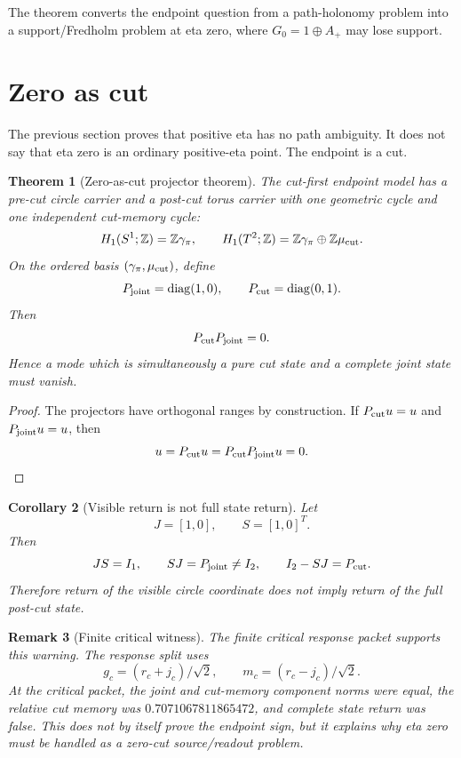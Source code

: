 \documentclass[11pt]{article}
\newtheorem{theorem}{Theorem}[section]
\newtheorem{corollary}[theorem]{Corollary}
\newtheorem{remark}[theorem]{Remark}
\begin{document}
The theorem converts the endpoint question from a path-holonomy problem into a support/Fredholm problem at eta zero, where \(G_0=1\oplus A_+\) may lose support.

\section{Zero as cut}

The previous section proves that positive eta has no path ambiguity.  It does not say that eta zero is an ordinary positive-eta point.  The endpoint is a cut.

\begin{theorem}[Zero-as-cut projector theorem]
The cut-first endpoint model has a pre-cut circle carrier and a post-cut torus carrier with one geometric cycle and one independent cut-memory cycle:
\[
H_1(S^1;\mathbb Z)=\mathbb Z\gamma_\pi,
\qquad
H_1(T^2;\mathbb Z)=\mathbb Z\gamma_\pi\oplus\mathbb Z\mu_{\rm cut}.
\]
On the ordered basis \((\gamma_\pi,\mu_{\rm cut})\), define
\[
P_{\rm joint}=\operatorname{diag}(1,0),
\qquad
P_{\rm cut}=\operatorname{diag}(0,1).
\]
Then
\[
P_{\rm cut}P_{\rm joint}=0.
\]
Hence a mode which is simultaneously a pure cut state and a complete joint state must vanish.
\end{theorem}

\begin{proof}
The projectors have orthogonal ranges by construction.  If \(P_{\rm cut}u=u\) and \(P_{\rm joint}u=u\), then
\[
u=P_{\rm cut}u=P_{\rm cut}P_{\rm joint}u=0.
\]
\end{proof}

\begin{corollary}[Visible return is not full state return]
Let
\[
J=[1,0],\qquad S=[1,0]^T.
\]
Then
\[
JS=I_1,\qquad SJ=P_{\rm joint}\ne I_2,\qquad I_2-SJ=P_{\rm cut}.
\]
Therefore return of the visible circle coordinate does not imply return of the full post-cut state.
\end{corollary}

\begin{remark}[Finite critical witness]
The finite critical response packet supports this warning.  The response split uses
\[
g_c=(r_c+j_c)/\sqrt2,
\qquad
m_c=(r_c-j_c)/\sqrt2.
\]
At the critical packet, the joint and cut-memory component norms were equal, the relative cut memory was \(0.7071067811865472\), and complete state return was false.  This does not by itself prove the endpoint sign, but it explains why eta zero must be handled as a zero-cut source/readout problem.
\end{remark}
\end{document}
